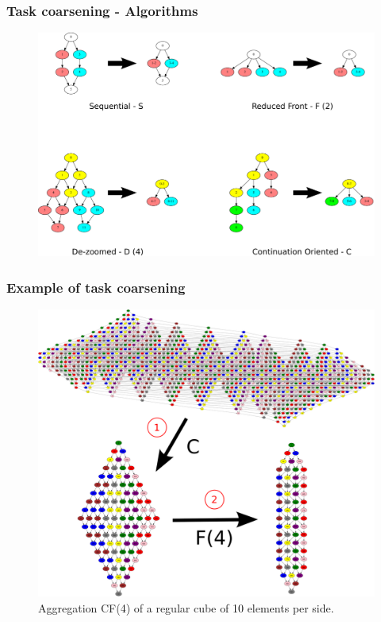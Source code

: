 \documentclass{beamer}
\begin{document}
\begin{frame}
  \frametitle{Task coarsening - Algorithms}

  \begin{figure}[t!]
    \centering
    \includegraphics[width=\linewidth]{all_algo}
  \end{figure}
\end{frame}


\begin{frame}
  \frametitle{Example of task coarsening}

  \begin{figure}[t!]
    \centering
    \includegraphics[width=0.7\linewidth]{G_agg}
    \caption{Aggregation CF(4) of a regular cube of 10 elements per side.}
  \end{figure}
\end{frame}
\end{document}
